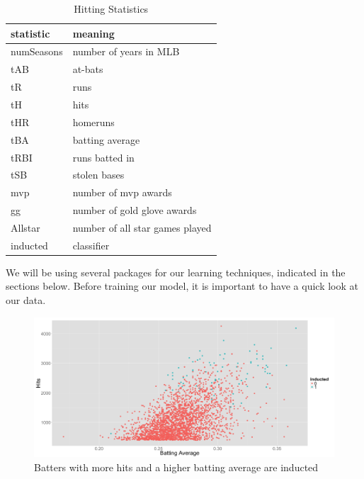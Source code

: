 \documentclass[preprint,12pt]{elsarticle}
\begin{document}
\begin{table}[h]
\centering
\begin{tabular}{|l | l|}
\hline
statistic & meaning \\
\hline
	numSeasons & number of years in MLB \\
	tAB & at-bats \\
	tR & runs \\
	tH & hits \\
	tHR & homeruns \\
	tBA & batting average \\
	tRBI & runs batted in \\
	tSB & stolen bases \\
	mvp & number of mvp awards \\
	gg & number of gold glove awards \\
	Allstar & number of all star games played \\
	inducted & classifier \\
\hline
\end{tabular}
\caption{Hitting Statistics}
\end{table}


We will be using several packages for our learning techniques, indicated in the sections below. Before training our model, it is important to have a quick look at our data.

\begin{figure}[h]
	\centering
	\includegraphics[width=\textwidth]{BAandHits}
	\caption{Batters with more hits and a higher batting average are inducted}
\end{figure}
\end{document}
